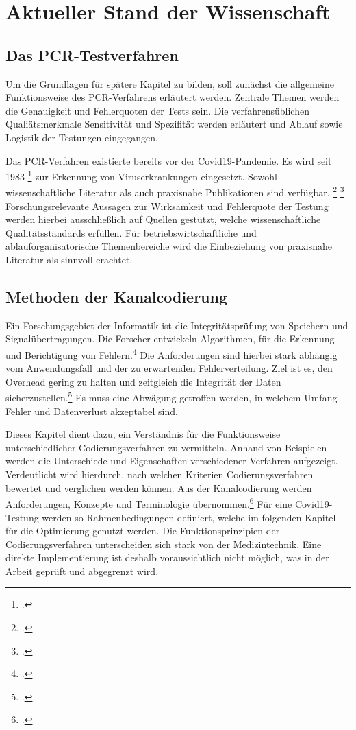 
\chapter{Aktueller Stand der Wissenschaft}
\section{Das PCR-Testverfahren}
Um die Grundlagen für spätere Kapitel zu bilden, soll zunächst die allgemeine Funktionsweise des PCR-Verfahrens erläutert werden.
Zentrale Themen werden die Genauigkeit und Fehlerquoten der Tests sein.
Die verfahrensüblichen Qualiätsmerkmale Sensitivität und Spezifität werden erläutert und Ablauf sowie Logistik der Testungen eingegangen.

Das PCR-Verfahren existierte bereits vor der Covid19-Pandemie.
Es wird seit 1983
\footcite{wink_pcr_1994,S. 5}
zur Erkennung von Viruserkrankungen eingesetzt.
Sowohl wissenschaftliche Literatur als auch praxisnahe Publikationen sind verfügbar.
\footcite{clewley_polymerase_1995}
\footcite{wehrle_weber_pcr_1994}
Forschungsrelevante Aussagen zur Wirksamkeit und Fehlerquote der Testung werden hierbei ausschließlich auf Quellen gestützt, welche wissenschaftliche Qualitätsstandards erfüllen.
Für betriebswirtschaftliche und ablauforganisatorische Themenbereiche wird die Einbeziehung von praxisnahe Literatur als sinnvoll erachtet.

\section{Methoden der Kanalcodierung}
Ein Forschungsgebiet der Informatik ist die Integritätsprüfung von Speichern und Signalübertragungen.
Die Forscher entwickeln Algorithmen, für die Erkennung und Berichtigung von Fehlern.\footcite{hamming_information_1987}
Die Anforderungen sind hierbei stark abhängig vom Anwendungsfall und der zu erwartenden Fehlerverteilung.
Ziel ist es, den Overhead gering zu halten und zeitgleich die Integrität der Daten sicherzustellen.\footcite{blahut_algebraic_1992}
Es muss eine Abwägung getroffen werden, in welchem Umfang Fehler und Datenverlust akzeptabel sind.

Dieses Kapitel dient dazu, ein Verständnis für die Funktionsweise unterschiedlicher Codierungsverfahren zu vermitteln.
Anhand von Beispielen werden die Unterschiede und Eigenschaften verschiedener Verfahren aufgezeigt.
Verdeutlicht wird hierdurch, nach welchen Kriterien Codierungsverfahren bewertet und verglichen werden können.
Aus der Kanalcodierung werden Anforderungen, Konzepte und Terminologie übernommen.\footcite{dankmeier_codierung_1994}
Für eine Covid19-Testung werden so Rahmenbedingungen definiert, welche im folgenden Kapitel für die Optimierung genutzt werden.
Die Funktionsprinzipien der Codierungsverfahren unterscheiden sich stark von der Medizintechnik.
Eine direkte Implementierung ist deshalb voraussichtlich nicht möglich, was in der Arbeit geprüft und abgegrenzt wird.

